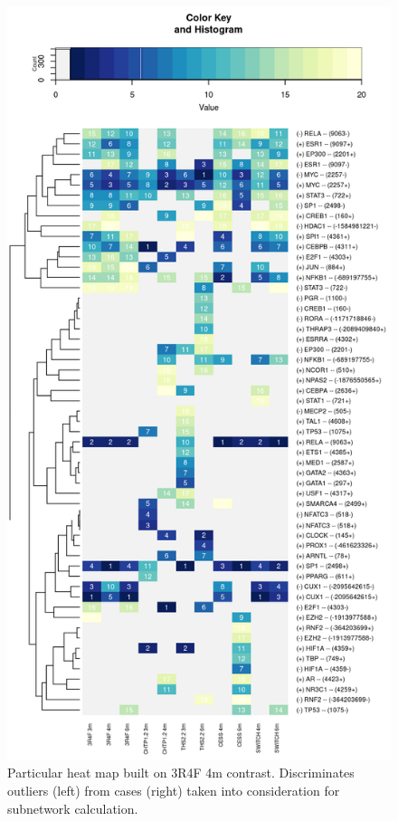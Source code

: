 \begin{figure}
    \centering
    \includegraphics[width=\textwidth, height=\textheight, keepaspectratio]{Major Thesis/figures/iut/heat/heatmap-contrasts.png}
    \caption{Particular heat map built on 3R4F 4m contrast. Discriminates outliers (left) from cases (right) taken into consideration for subnetwork calculation.}
    \label{fig:heatmap-overview}
\end{figure}

